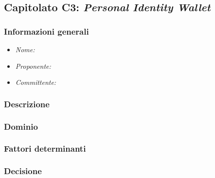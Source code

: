 \subsection{Capitolato C3: \textit{Personal Identity Wallet}}
\subsubsection{Informazioni generali}
\begin{itemize}
    \item \textit{Nome:}
    \item \textit{Proponente:}
    \item \textit{Committente:}
\end{itemize}
\subsubsection{Descrizione}
\subsubsection{Dominio}
\subsubsection{Fattori determinanti}
\subsubsection{Decisione}

